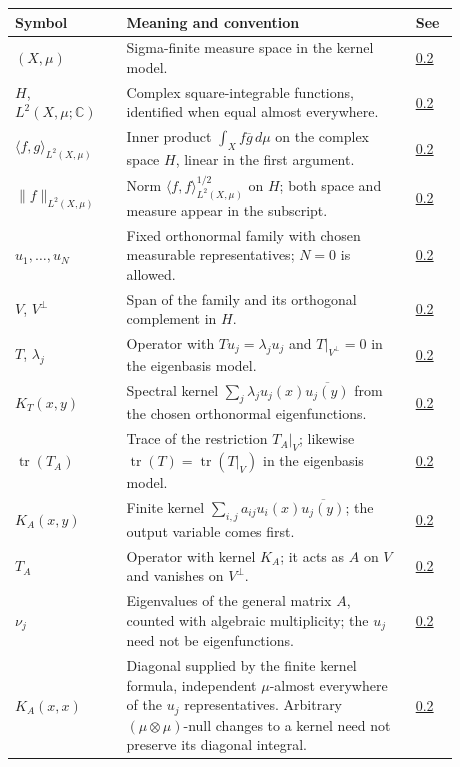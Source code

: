 \begin{longtable}{p{0.22\linewidth}p{0.58\linewidth}p{0.08\linewidth}}
\textbf{Symbol} & \textbf{Meaning and convention} & \textbf{See} \\ \hline
$(X,\mu)$ & Sigma-finite measure space in the kernel model. & \hyperref[finite-kernel-model]{0.2} \\
$H$, $L^2(X,\mu;\mathbb C)$ & Complex square-integrable functions, identified when equal almost everywhere. & \hyperref[finite-kernel-model]{0.2} \\
$\langle f,g\rangle_{L^2(X,\mu)}$ & Inner product $\int_X f\overline g\,d\mu$ on the complex space $H$, linear in the first argument. & \hyperref[finite-kernel-model]{0.2} \\
$\|f\|_{L^2(X,\mu)}$ & Norm $\langle f,f\rangle_{L^2(X,\mu)}^{1/2}$ on $H$; both space and measure appear in the subscript. & \hyperref[finite-kernel-model]{0.2} \\
$u_1,\ldots,u_N$ & Fixed orthonormal family with chosen measurable representatives; $N=0$ is allowed. & \hyperref[finite-kernel-model]{0.2} \\
$V$, $V^\perp$ & Span of the family and its orthogonal complement in $H$. & \hyperref[finite-kernel-model]{0.2} \\
$T$, $\lambda_j$ & Operator with $Tu_j=\lambda_j u_j$ and $T|_{V^\perp}=0$ in the eigenbasis model. & \hyperref[finite-kernel-model]{0.2} \\
$K_T(x,y)$ & Spectral kernel $\sum_j\lambda_j u_j(x)\overline{u_j(y)}$ from the chosen orthonormal eigenfunctions. & \hyperref[finite-spectral-kernel]{0.2} \\
$\operatorname{tr}(T_A)$ & Trace of the restriction $T_A|_V$; likewise $\operatorname{tr}(T)=\operatorname{tr}(T|_V)$ in the eigenbasis model. & \hyperref[finite-kernel-trace-definition]{0.2} \\
$K_A(x,y)$ & Finite kernel $\sum_{i,j}a_{ij}u_i(x)\overline{u_j(y)}$; the output variable comes first. & \hyperref[finite-kernel-operator]{0.2} \\
$T_A$ & Operator with kernel $K_A$; it acts as $A$ on $V$ and vanishes on $V^\perp$. & \hyperref[finite-kernel-operator]{0.2} \\
$\nu_j$ & Eigenvalues of the general matrix $A$, counted with algebraic multiplicity; the $u_j$ need not be eigenfunctions. & \hyperref[finite-kernel-trace-identity]{0.2} \\
$K_A(x,x)$ & Diagonal supplied by the finite kernel formula, independent $\mu$-almost everywhere of the $u_j$ representatives. Arbitrary $(\mu\otimes\mu)$-null changes to a kernel need not preserve its diagonal integral. & \hyperref[kernel-diagonal-representatives]{0.2} \\
\end{longtable}

